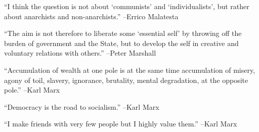 \documentclass{article}%
\begin{document}
\linebreak%
\vspace{1mm}%
\begin{minipage}{\textwidth}%
\flushleft%
“I think the question is not about ‘communists’ and ‘individualists’, but rather about anarchists and non{-}anarchists.”%
\linebreak%
\vspace{1mm}%
–Errico Malatesta%
\linebreak%
\vspace{1mm}%
\end{minipage}%
\linebreak%
\vspace{1mm}%
\begin{minipage}{\textwidth}%
\flushleft%
“The aim is not therefore to liberate some ‘essential self’ by throwing off the burden of government and the State, but to develop the self in creative and voluntary relations with others.”%
\linebreak%
\vspace{1mm}%
–Peter Marshall%
\linebreak%
\vspace{1mm}%
\end{minipage}%
\linebreak%
\vspace{1mm}%
\begin{minipage}{\textwidth}%
\flushleft%
“Accumulation of wealth at one pole is at the same time accumulation of misery, agony of toil, slavery, ignorance, brutality, mental degradation, at the opposite pole.”%
\linebreak%
\vspace{1mm}%
–Karl Marx%
\linebreak%
\vspace{1mm}%
\end{minipage}%
\linebreak%
\vspace{1mm}%
\begin{minipage}{\textwidth}%
\flushleft%
“Democracy is the road to socialism.”%
\linebreak%
\vspace{1mm}%
–Karl Marx%
\linebreak%
\vspace{1mm}%
\end{minipage}%
\linebreak%
\vspace{1mm}%
\begin{minipage}{\textwidth}%
\flushleft%
“I make friends with very few people but I highly value them.”%
\linebreak%
\vspace{1mm}%
–Karl Marx%
\linebreak%
\vspace{1mm}%
\end{minipage}%
\end{document}
